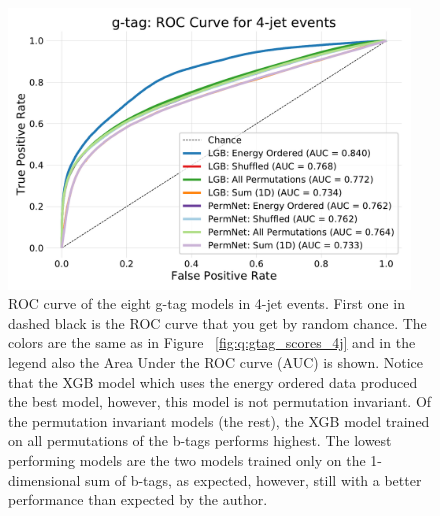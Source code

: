 \documentclass[a4paper, twoside, nobib]{tufte-book}
\newcommand{\figref}[1]{Figure ~\ref{#1}}
\begin{document}
\begin{figure}
  \includegraphics[width=0.95\textwidth, trim=10 10 10 40, clip]{figures/quarks/gtag_ROC_4_jet-down_sample=1.00-ML_vars=vertex-selection=b-ejet_min=4-n_iter_RS_lgb=99-n_iter_RS_xgb=9-cdot_cut=0.90-version=19.pdf}
  \caption[ROC curve for g-tag in 4-jet events]
          {ROC curve of the eight g-tag models in 4-jet events. First one in dashed black is the ROC curve that you get by random chance. The colors are the same as in \figref{fig:q:gtag_scores_4j} and in the legend also the Area Under the ROC curve (AUC) is shown. 
          Notice that the XGB model which uses the energy ordered data produced the best model, however, this model is not permutation invariant. Of the permutation invariant models (the rest), the XGB model trained on all permutations of the b-tags performs highest. The lowest performing models are the two models trained only on the 1-dimensional sum of b-tags, as expected, however, still with a better performance than expected by the author.  
          } 
  \label{fig:q:roc_gtag_4j}
\end{figure}
\end{document}
